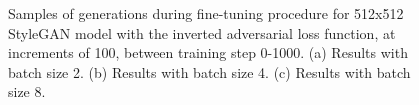   \begin{figure}[!htbp]
    \centering
    \hfill
    \hfill
    \caption[Samples of generations during fine-tuning procedure for 512x512 StyleGAN model with the inverted adversarial loss function]{Samples of generations during fine-tuning procedure for 512x512 StyleGAN model with the inverted adversarial loss function, at increments of 100, between training step 0-1000. (a) Results with batch size 2. (b) Results with batch size 4. (c) Results with batch size 8.}
    \label{fig:c4:512-OG-samples}
  \end{figure}

